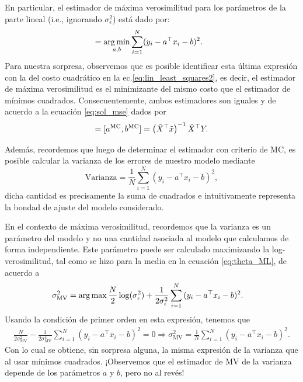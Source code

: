 En particular, el estimador  de máxima verosimilitud para los parámetros de  la parte lineal (i.e., ignorando $\sigma^2_\epsilon$) está dado por:
\begin{align}
	[a^{\text{MV}} ,b^{\text{MV}} ]
						&= \argmin_{a,b} \sum_{i=1}^N (y_i-a^\top x_i - b)^2. \label{eq:theta_ML}
\end{align}
Para  nuestra  sorpresa, observemos que es posible identificar esta última expresión con la del costo cuadrático en la ec.\eqref{eq:lin_least_squares2}, es decir, el estimador de máxima verosimilitud es el minimizante del mismo costo que el estimador de mínimos cuadrados. Consecuentemente, ambos estimadores son iguales y de acuerdo a la ecuación \eqref{eq:sol_mse} dados por 
\begin{equation}
	[a^{\text{MV}} ,b^{\text{MV}} ]=[a^{\text{MC}} ,b^{\text{MC}} ] = \left(\tX^\top\tx\right)^{-1} \tX^\top Y.
\end{equation}

Además, recordemos que luego de determinar el estimador con criterio de MC, es posible calcular la varianza de los errores de nuestro modelo mediante 
\begin{equation}
	\text{Varianza} = \frac{1}{N}\sum_{i=1}^N (y_i-a^\top x_i -b)^2,
\end{equation}
dicha cantidad es precisamente la suma de cuadrados e intuitivamente representa la bondad de ajuste del modelo considerado. 

En el contexto de máxima verosimilitud, recordemos que la varianza es un parámetro del modelo y no una cantidad asociada al modelo que calculamos de forma independiente. Este parámetro puede ser calculado maximizando la log-verosimilitud, tal como se hizo para la media en la ecuación \eqref{eq:theta_ML}, de acuerdo a
\begin{align}
	\sigma^2_{\text{MV}} &= \operatorname*{arg\,max} \frac{N}{2} \log(\sigma_\epsilon^{2}) + \frac{1}{2\sigma_\epsilon^2}\sum_{i=1}^N {(y_i-a^\top x_i -b)^2}. \label{eq:sigma_ML}
\end{align}
Usando la condición de primer orden en esta expresión, tenemos que
\begin{align}
	\frac{N}{2\sigma^2_{\text{MV}}} - \frac{1}{2\sigma^4_{\text{MV}}}\sum_{i=1}^N {(y_i-a^\top x_i -b)^2} = 0 \Rightarrow \sigma^2_{\text{MV}} = \frac{1}{N}\sum_{i=1}^N {(y_i-a^\top x_i -b)^2}.
\end{align}
Con lo cual se obtiene, sin sorpresa alguna, la misma expresión de la varianza que al usar mínimos cuadrados. ¡Observemos que el estimador de MV de la varianza depende de los parámetros $a$ y $b$, pero no al revés!

